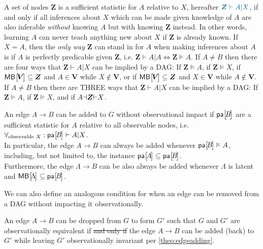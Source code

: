  A set of nodes $\bm{Z}$ is a sufficient statistic for $A$ relative to $X$, hereafter $\mblue{\bm{Z}\vdash A|X}$,
if and only if all inferences about $X$ which can be made given knowledge of $A$ are also inferable \emph{without} knowing $A$ but with knowing $\bm{Z}$ instead. In other words, learning $A$ can never teach anything new about $X$ if $\bm{Z}$ is already known. If $X=A$, then the \emph{only way} $\bm{Z}$ can stand in for $A$ when making inferences about $A$ is if $A$ is perfectly predicable given $\bm{Z}$, i.e. ${\bm{Z}\vdash A|A\iff \bm{Z}\vDash A}$. If $A\neq B$ then there are four  ways that $\bm{Z}\vdash A|X$ can be implied by a DAG: If $\bm{Z}\vDash A$, if $\bm{Z}\vDash X$, if $\NamedFunction{MB}{\!\bm{V}\!}\subseteq \bm{Z}$ and $A\in \bm{V}$ while $X\not\in \bm{V}$, or if $\NamedFunction{MB}{\!\bm{V}\!}\subseteq \bm{Z}$ and $X\in \bm{V}$ while $A\not\in \bm{V}$.  If $A\neq B$ then there are THREE ways that $\bm{Z}\vdash A|X$ can be implied by a DAG: If $\bm{Z}\vDash A$, if $\bm{Z}\vDash X$, and if ${A\mathord{\dashv}\bm{Z}\mathord{\vdash}X}$.

\begin{theorem}\label{theo:edgeadding}
An edge $A\to B$ can be added to $G$ without observational impact if $\NamedFunction{pa}{\!B\!}$ are a sufficient statistic for $A$ relative to all observable nodes, i.e. $\forall_{\text{observable }X}:\NamedFunction{pa}{\!B\!}\vdash A|X$.\\
In particular, the edge $A\to B$ can always be added whenever $\NamedFunction{pa}{\!B\!}\vDash A$, including, but not limited to, the instance  $\NamedFunction{pa}{\!A\!}\subseteq \NamedFunction{pa}{\!B\!}$.\\
Furthermore, the edge $\Lambda\to B$ can be also always be added whenever $\Lambda$ is latent and $\NamedFunction{MB}{\!\Lambda\!}\subseteq\NamedFunction{pa}{\!B\!}$.
\end{theorem}

We can also define an analogous condition for when an edge can be removed from a DAG without impacting it observationally.
\begin{corollary}\label{cor:edgedropping}
An edge $A\to B$ can be dropped from $G$ to form $G'$ such that $G$ and $G'$ are observationally equivalent if \sout{and only if} the edge $A\to B$ can be added (back) to $G'$ while leaving $G'$ observationally invariant per \cref{theo:edgeadding}.
\end{corollary}


